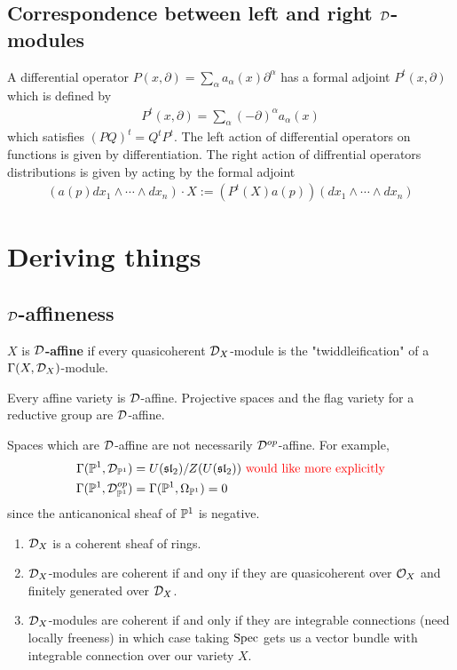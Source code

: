 \subsection{Correspondence between left and right $\cD$-modules}
A differential operator $P(x,\partial) = \sum_{\alpha} a_\alpha(x)\partial^\alpha$ has a formal adjoint
$P^t(x,\partial)$ which is defined by \begin{align*}
	P^t(x,\partial) = \sum_{\alpha} (-\partial)^\alpha a_\alpha(x)
\end{align*} which satisfies $(PQ)^t = Q^tP^t$. The left action of differential operators on
functions is given by differentiation. The right action of diffrential operators distributions is given by
acting by the formal adjoint \begin{align*}
	(a(p)dx_1 \wedge \cdots \wedge dx_n)\cdot X := (P^t(X)a(p))(dx_1\wedge \cdots \wedge dx_n)
\end{align*}

\section{Deriving things}
\subsection{$\cD$-affineness}
\begin{definition}
	$X$ is \textbf{$\cD$-affine} if every quasicoherent $\cD_X$-module is the
	"twiddleification" of a $\Gamma(X,\cD_X)$-module.
\end{definition}
Every affine variety is $\cD$-affine. Projective spaces and
the flag variety for a reductive group are $\cD$-affine.

\begin{remark}
	Spaces which are $\cD$-affine are not necessarily $\cD^{op}$-affine. For example,
	\begin{align*}
		\Gamma(\P^1,\cD_{\P^1})      & = U(\mf{sl}_2)/Z(U(\mf{sl}_2)) \text{\red{ would like more explicitly}} \\
		\Gamma(\P^1,\cD_{\P^1}^{op}) & = \Gamma(\P^1,\Omega_{\P^1}) = 0
	\end{align*} since the anticanonical sheaf of $\P^1$ is negative.
\end{remark}

\begin{proposition}
	\begin{enumerate}
		\item $\cD_X$ is a coherent sheaf of rings.
		\item $\cD_X$-modules are coherent if and ony if they are quasicoherent over $\cO_X$ and
		      finitely generated over $\cD_X$.
		\item $\cD_X$-modules are coherent if and only if they are integrable connections (need
		      locally freeness) in which case taking $\Spec$ gets us a vector bundle with integrable
		      connection over our variety $X$.
	\end{enumerate}
\end{proposition}

